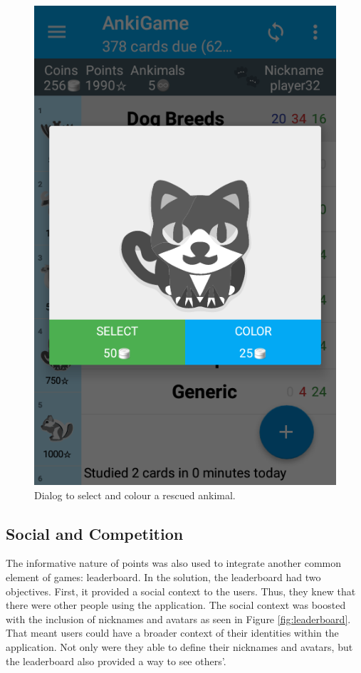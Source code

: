 \begin{figure}[htb]
    \vskip 5mm
        \begin{center}
            \includegraphics[scale=0.4]{./Figures/ankimal_selection.png}
            \caption{Dialog to select and colour a rescued ankimal.}
            \label{fig:ankimals-select}
        \end{center}
    \vskip -5mm
\end{figure}

\subsection{Social and Competition}
The informative nature of points was also used to integrate another common element of games: leaderboard. In the solution, the leaderboard had two objectives. First, it provided a social context to the users. Thus, they knew that there were other people using the application. The social context was boosted with the inclusion of nicknames and avatars as seen in Figure \ref{fig:leaderboard}. That meant users could have a broader context of their identities within the application. Not only were they able to define their nicknames and avatars, but the leaderboard also provided a way to see others'.

